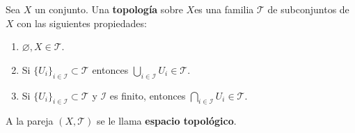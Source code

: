 

\begin{definition}
Sea $X$ un conjunto. Una \textbf{topología} sobre $X$es una familia $\mathcal{T}$ de subconjuntos de $X$ con las siguientes propiedades:
\begin{enumerate}[label=\textnormal{(\roman*)}]
\item $\varnothing, X \in \mathcal{T}$.
\item Si $\{ U_i \}_{i \in \mathcal{I}} \subset \mathcal{T}$ entonces $\bigcup_{i \in \mathcal{I}} U_i \in \mathcal{T}$.
\item Si $\{ U_i \}_{i \in \mathcal{I}} \subset \mathcal{T}$ y $\mathcal{I}$ es finito, entonces $\bigcap_{i \in \mathcal{I}} U_i \in \mathcal{T}$.
\end{enumerate}

A la pareja $(X,\mathcal{T})$ se le llama \textbf{espacio topológico}.
\end{definition}

